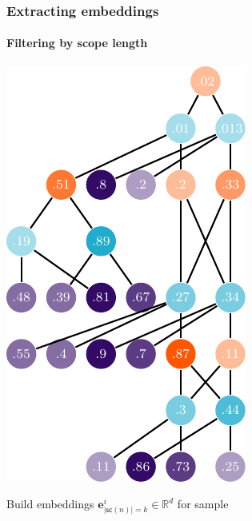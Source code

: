 \documentclass[10pt, t, xcolor={usenames,dvipsnames,svgnames}, compress]{beamer}
\begin{document}
\begin{frame}
\begin{minipage}[t]{0.55\linewidth}
  \end{minipage}
\end{frame}

\begin{frame}
  \frametitle{Extracting embeddings}
  \framesubtitle{Filtering by scope length}
  \begin{minipage}{0.4\linewidth}
    \begin{center}
      \includegraphics[width=.86\columnwidth]{figures/spn-eval-emb-II}
    \end{center}
  \end{minipage}\hfill\begin{minipage}[t]{0.55\linewidth}
    \vspace{-80pt}
    Build embeddings $\mathbf{e}^{i}_{|\mathsf{sc}(n)|=k}\in \mathbb{R}^{d}$ for sample

\end{minipage}
\end{frame}
\end{document}
